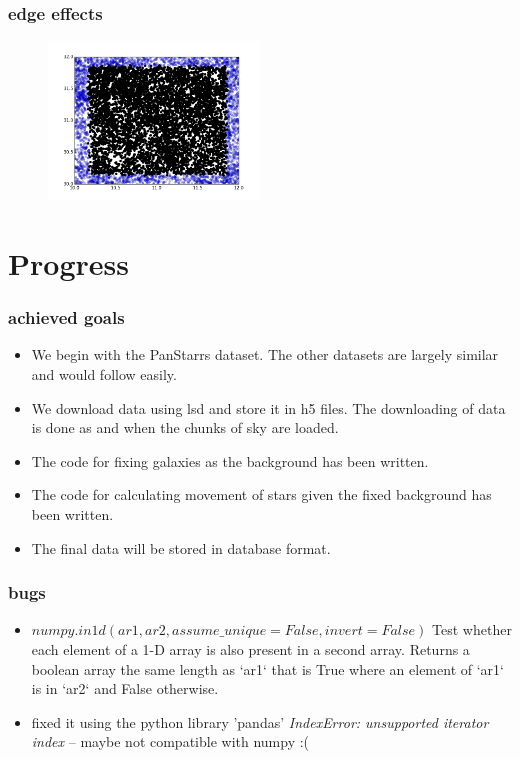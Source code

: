 \documentclass[10pt, compress]{beamer}
\begin{document}
\begin{frame}
\frametitle{edge effects}
\begin{figure}\centering
\includegraphics[width=0.5\textwidth]{edgeEffects.png}
\end{figure}

\end{frame}

\section{Progress}

\begin{frame}
\frametitle{achieved goals}
	\begin{itemize}
		\item<1-> We begin with the PanStarrs dataset. The other datasets are largely similar and would follow easily. 
        \item<2-> We download data using lsd and store it in h5 files. The downloading of data is done as and when the chunks of sky are loaded.  
        \item<3->The code for fixing galaxies as the background has been written. 
        \item<4-> The code for calculating movement of stars given the fixed background has been written. 
        \item<5-> The final data will be stored in database format. 
	\end{itemize}
\end{frame}

\begin{frame}
\frametitle{bugs}
	\begin{itemize}
		\item<1-> $numpy.in1d(ar1, ar2, assume\_unique=False, invert=False)$
         Test whether each element of a 1-D array is also present in a second array.
    Returns a boolean array the same length as `ar1` that is True
    where an element of `ar1` is in `ar2` and False otherwise. \\
      
	
	\item<2-> fixed it using the python library 'pandas' \textit{IndexError: unsupported iterator index}  -- maybe not compatible with numpy :(
	\end{itemize}
\end{frame}
\end{document}
